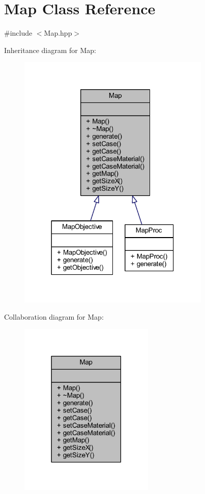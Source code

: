 \hypertarget{class_map}{}\section{Map Class Reference}
\label{class_map}


{\ttfamily \#include $<$Map.\+hpp$>$}



Inheritance diagram for Map\+:\nopagebreak
\begin{figure}[H]
\begin{center}
\leavevmode
\includegraphics[width=260pt]{class_map__inherit__graph}
\end{center}
\end{figure}


Collaboration diagram for Map\+:\nopagebreak
\begin{figure}[H]
\begin{center}
\leavevmode
\includegraphics[width=182pt]{class_map__coll__graph}
\end{center}
\end{figure}
